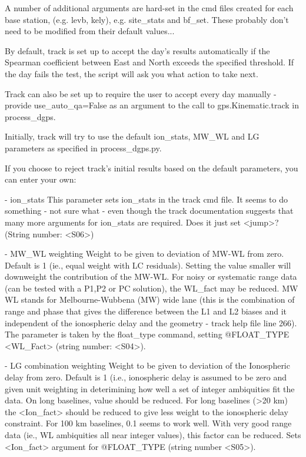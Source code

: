 \documentclass[11pt]{article} %
\begin{document}
A number of additional arguments are hard-set in the cmd files created for each base station, (e.g. levb, kely), e.g. site_stats and bf_set. These probably don't need to be modified from their default values...

By default, track is set up to accept the day's results automatically if the Spearman coefficient between East and North exceeds the specified threshold. If the day fails the test, the script will ask you what action to take next.

Track can also be set up to require the user to accept every day manually - provide use_auto_qa=False as an argument to the call to gps.Kinematic.track in process_dgps. 

Initially, track will try to use the default ion_stats, MW_WL and LG parameters as specified in process_dgps.py.

If you choose to reject track's initial results based on the default parameters, you can enter your own:

	- ion_stats 
		This parameter sets ion_stats in the track cmd file. It seems to do something - not sure what - even though the track documentation suggests that many more arguments for ion_stats are required. 	Does it just set <jump>? (String number: <S06>)
		
	- MW_WL weighting 
		Weight to be given to deviation of MW-WL from zero. Default is 1 (ie., equal weight with LC residuals). Setting the value smaller will downweight the contribution of the MW-WL. For noisy or systematic range data (can be tested with a P1,P2 or PC solution), the WL_fact may be reduced.
		MW WL stands for Melbourne-Wubbena (MW) wide lane (this is the combination of range and phase that 
		gives the difference between the L1 and L2 biases and it independent of the ionospheric delay and 
		the geometry - track help file line 266). The parameter is taken by the float_type command, setting @FLOAT_TYPE <WL_Fact> (string number: <S04>).

	- LG combination weighting 
		Weight to be given to deviation of the Ionospheric delay from zero.  Default is 1 (i.e., ionospheric delay is assumed to be zero and given unit weighting in deterimining how well a set of integer ambiquities fit the data.  On long baselines, value should be reduced.
		For long baselines (>20 km) the <Ion_fact> should be reduced to give less weight to the ionospheric delay constraint.  For 100 km baselines, 0.1 seems to work well.  With very good range data (ie., WL ambiquities all near integer values), this factor can be reduced. Sets <Ion_fact> argument for @FLOAT_TYPE (string number <S05>).
		
\end{document}
